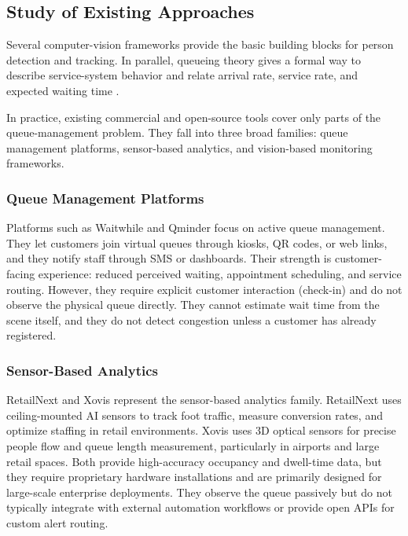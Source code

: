 \subsection{Study of Existing Approaches}
Several computer-vision frameworks provide the basic building blocks for person detection and tracking. In parallel, queueing theory gives a formal way to describe service-system behavior and relate arrival rate, service rate, and expected waiting time \cite{gross_queueing}.

In practice, existing commercial and open-source tools cover only parts of the queue-management problem. They fall into three broad families: queue management platforms, sensor-based analytics, and vision-based monitoring frameworks.

\subsubsection{Queue Management Platforms}
Platforms such as Waitwhile \cite{waitwhile2026} and Qminder \cite{qminder2026} focus on active queue management. They let customers join virtual queues through kiosks, QR codes, or web links, and they notify staff through SMS or dashboards. Their strength is customer-facing experience: reduced perceived waiting, appointment scheduling, and service routing. However, they require explicit customer interaction (check-in) and do not observe the physical queue directly. They cannot estimate wait time from the scene itself, and they do not detect congestion unless a customer has already registered.

\subsubsection{Sensor-Based Analytics}
RetailNext \cite{retailnext2026} and Xovis \cite{xovis2026} represent the sensor-based analytics family. RetailNext uses ceiling-mounted AI sensors to track foot traffic, measure conversion rates, and optimize staffing in retail environments. Xovis uses 3D optical sensors for precise people flow and queue length measurement, particularly in airports and large retail spaces. Both provide high-accuracy occupancy and dwell-time data, but they require proprietary hardware installations and are primarily designed for large-scale enterprise deployments. They observe the queue passively but do not typically integrate with external automation workflows or provide open APIs for custom alert routing.

